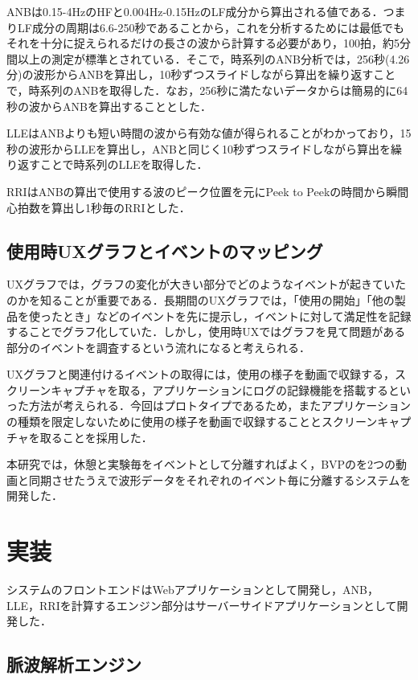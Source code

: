 ANBは0.15-4HzのHFと0.004Hz-0.15HzのLF成分から算出される値である．つまりLF成分の周期は6.6-250秒であることから，これを分析するためには最低でもそれを十分に捉えられるだけの長さの波から計算する必要があり，100拍，約5分間以上の測定が標準とされている\cite{yamaguchi}．そこで，時系列のANB分析では，256秒(4.26分)の波形からANBを算出し，10秒ずつスライドしながら算出を繰り返すことで，時系列のANBを取得した．なお，256秒に満たないデータからは簡易的に64秒の波からANBを算出することとした．

LLEはANBよりも短い時間の波から有効な値が得られることがわかっており，15秒の波形からLLEを算出し，ANBと同じく10秒ずつスライドしながら算出を繰り返すことで時系列のLLEを取得した．

RRIはANBの算出で使用する波のピーク位置を元にPeek to Peekの時間から瞬間心拍数を算出し1秒毎のRRIとした．

\subsection{使用時UXグラフとイベントのマッピング}

UXグラフでは，グラフの変化が大きい部分でどのようなイベントが起きていたのかを知ることが重要である．長期間のUXグラフでは，「使用の開始」「他の製品を使ったとき」などのイベントを先に提示し，イベントに対して満足性を記録することでグラフ化していた．しかし，使用時UXではグラフを見て問題がある部分のイベントを調査するという流れになると考えられる．

UXグラフと関連付けるイベントの取得には，使用の様子を動画で収録する，スクリーンキャプチャを取る，アプリケーションにログの記録機能を搭載するといった方法が考えられる．今回はプロトタイプであるため，またアプリケーションの種類を限定しないために使用の様子を動画で収録することとスクリーンキャプチャを取ることを採用した．

本研究では，休憩と実験毎をイベントとして分離すればよく，BVPのを2つの動画と同期させたうえで波形データをそれぞれのイベント毎に分離するシステムを開発した．

\section{実装}

システムのフロントエンドはWebアプリケーションとして開発し，ANB，LLE，RRIを計算するエンジン部分はサーバーサイドアプリケーションとして開発した．

\subsection{脈波解析エンジン}

